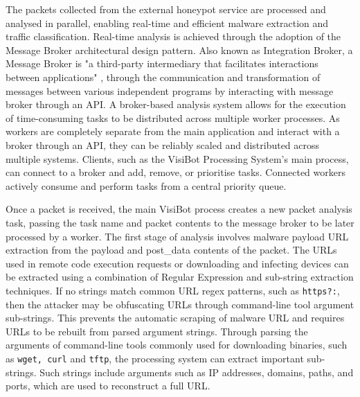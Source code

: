 The packets collected from the external honeypot service are processed and analysed in parallel, enabling real-time and efficient malware extraction and traffic classification. Real-time analysis is achieved through the adoption of the Message Broker architectural design pattern. Also known as Integration Broker, a Message Broker is "a third-party intermediary that facilitates interactions between applications" \citep{IBDefinition}, through the communication and transformation of messages between various independent programs by interacting with message broker through an API. A broker-based analysis system allows for the execution of time-consuming tasks to be distributed across multiple worker processes. As workers are completely separate from the main application and interact with a broker through an API, they can be reliably scaled and distributed across multiple systems. Clients, such as the VisiBot Processing System's main process, can connect to a broker and add, remove, or prioritise tasks. Connected workers actively consume and perform tasks from a central priority queue. 

Once a packet is received, the main VisiBot process creates a new packet analysis task, passing the task name and packet contents to the message broker to be later processed by a worker. The first stage of analysis involves malware payload URL extraction from the payload and post\_data contents of the packet. The URLs used in remote code execution requests or downloading and infecting devices can be extracted using a combination of Regular Expression and sub-string extraction techniques. If no strings match common URL regex patterns, such as \texttt{https?:}, then the attacker may be obfuscating URLs through command-line tool argument sub-strings. This prevents the automatic scraping of malware URL and requires URLs to be rebuilt from parsed argument strings. Through parsing the arguments of command-line tools commonly used for downloading binaries, such as \texttt{wget, curl} and \texttt{tftp}, the processing system can extract important sub-strings. Such strings include arguments such as IP addresses, domains, paths, and ports, which are used to reconstruct a full URL.

